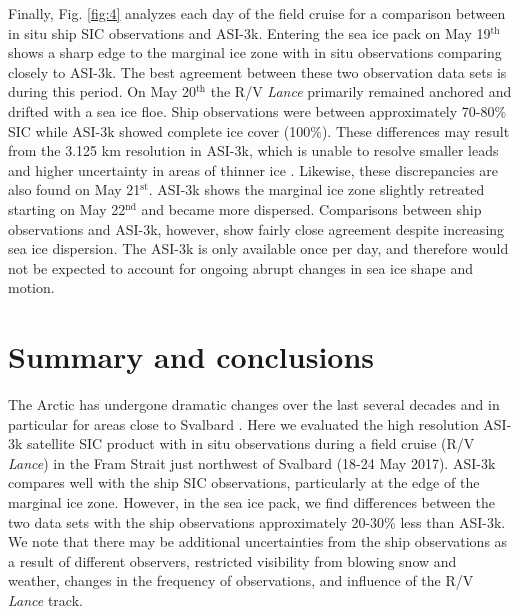 \documentclass[draft,linenumbers]{agujournal}
\begin{document}
Finally, Fig. \ref{fig:4} analyzes each day of the field cruise for a comparison between in situ ship SIC observations and ASI-3k. Entering the sea ice pack on May 19$^{\text{th}}$ shows a sharp edge to the marginal ice zone with in situ observations comparing closely to ASI-3k. The best agreement between these two observation data sets is during this period. On May 20$^{\text{th}}$ the R/V \textit{Lance} primarily remained anchored and drifted with a sea ice floe. Ship observations were between approximately 70-80\% SIC while ASI-3k showed complete ice cover (100\%). These differences may result from the 3.125 km resolution in ASI-3k, which is unable to resolve smaller leads and higher uncertainty in areas of thinner ice \citep{Scott2015}. Likewise, these discrepancies are also found on May 21$^\text{st}$. ASI-3k shows the marginal ice zone slightly retreated starting on May 22$^\text{nd}$ and became more dispersed. Comparisons between ship observations and ASI-3k, however, show fairly close agreement despite increasing sea ice dispersion. The ASI-3k is only available once per day, and therefore would not be expected to account for ongoing abrupt changes in sea ice shape and motion.

\section{Summary and conclusions}
\label{sec:4}
The Arctic has undergone dramatic changes over the last several decades \citep[e.g.,][]{Serreze2009,Stroeve2011,Laxon2013, Cohen2014} and in particular for areas close to Svalbard \citep[e.g.,][]{Nordli2014, Isaksen2016, Descamps2017}. Here we evaluated the high resolution ASI-3k satellite SIC product with in situ observations during a field cruise (R/V \textit{Lance}) in the Fram Strait just northwest of Svalbard (18-24 May 2017). ASI-3k compares well with the ship SIC observations, particularly at the edge of the marginal ice zone. However, in the sea ice pack, we find differences between the two data sets with the ship observations approximately 20-30\% less than ASI-3k. We note that there may be additional uncertainties from the ship observations as a result of different observers, restricted visibility from blowing snow and weather, changes in the frequency of observations, and influence of the R/V \textit{Lance} track.
\end{document}
